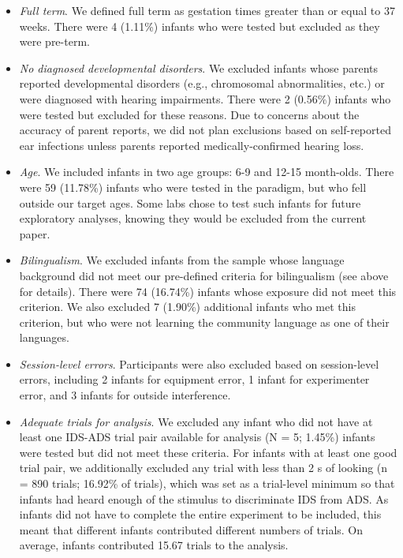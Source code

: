 \documentclass[
  english,
  ,man,floatsintext]{apa6}
\begin{document}
\begin{itemize}
\item
  \emph{Full term}. We defined full term as gestation times greater than or equal to 37 weeks. There were 4 (1.11\%) infants who were tested but excluded as they were pre-term.
\item
  \emph{No diagnosed developmental disorders}. We excluded infants whose parents reported developmental disorders (e.g., chromosomal abnormalities, etc.) or were diagnosed with hearing impairments. There were 2 (0.56\%) infants who were tested but excluded for these reasons. Due to concerns about the accuracy of parent reports, we did not plan exclusions based on self-reported ear infections unless parents reported medically-confirmed hearing loss.
\item
  \emph{Age}. We included infants in two age groups: 6-9 and 12-15 month-olds. There were 59 (11.78\%) infants who were tested in the paradigm, but who fell outside our target ages. Some labs chose to test such infants for future exploratory analyses, knowing they would be excluded from the current paper.
\item
  \emph{Bilingualism}. We excluded infants from the sample whose language background did not meet our pre-defined criteria for bilingualism (see above for details). There were 74 (16.74\%) infants whose exposure did not meet this criterion. We also excluded 7 (1.90\%) additional infants who met this criterion, but who were not learning the community language as one of their languages.
\item
  \emph{Session-level errors}. Participants were also excluded based on session-level errors, including 2 infants for equipment error, 1 infant for experimenter error, and 3 infants for outside interference.
\item
  \emph{Adequate trials for analysis}. We excluded any infant who did not have at least one IDS-ADS trial pair available for analysis (N = 5; 1.45\%) infants were tested but did not meet these criteria. For infants with at least one good trial pair, we additionally excluded any trial with less than 2 s of looking (n = 890 trials; 16.92\% of trials), which was set as a trial-level minimum so that infants had heard enough of the stimulus to discriminate IDS from ADS. As infants did not have to complete the entire experiment to be included, this meant that different infants contributed different numbers of trials. On average, infants contributed 15.67 trials to the analysis.
\end{itemize}
\end{document}
